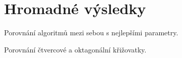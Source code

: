\section{Hromadné výsledky}\label{sec:hromadne_vysledky}

Porovnání algoritmů mezi sebou s nejlepšími parametry.

Porovnání čtvercové a oktagonální křižovatky.




